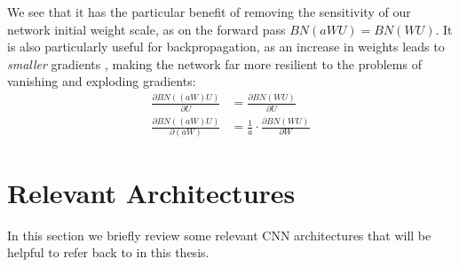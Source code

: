 We see that it has the particular benefit of removing
the sensitivity of our network initial weight scale, as on the forward pass
$BN(aWU) = BN(WU)$.  
It is also particularly useful for backpropagation, as an increase in
weights leads to \emph{smaller} gradients \cite{ioffe_batch_2015}, making
the network far more resilient to the problems of vanishing and exploding
gradients:
\begin{align}
  \frac{\partial BN((aW)U)}{\partial U} & =  \frac{\partial
  BN(WU)}{\partial U} \nonumber\\
  \frac{\partial BN((aW)U)}{\partial (aW)} & =  \frac{1}{a} \cdot \frac{\partial
  BN(WU)}{\partial W} 
\end{align}

\section{Relevant Architectures}
In this section we briefly review some relevant CNN architectures that will be
helpful to refer back to in this thesis. 


